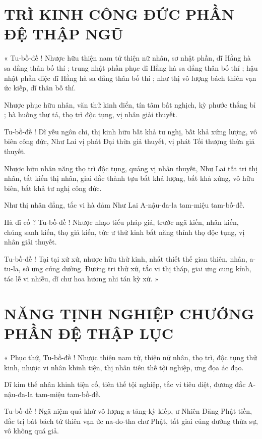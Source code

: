 	\section*{TRÌ KINH CÔNG ĐỨC PHẦN ĐỆ THẬP NGŨ}
	
	« Tu-bồ-đề ! Nhược hữu thiện nam tử thiện nữ nhân, sơ nhật phần, dĩ Hằng hà sa đẳng thân bố thí ; trung nhật phần phục dĩ Hằng hà sa đẳng thân bố thí ; hậu nhật phần diệc dĩ Hằng hà sa đẳng thân bố thí ; như thị vô lượng bách thiên vạn ức kiếp,  dĩ thân bố thí.
	
	Nhược phục hữu nhân, văn thử kinh điển, tín tâm bất nghịch, kỳ phước thắng bỉ ; hà huống thư tả, thọ trì độc tụng, vị nhân giải thuyết.
	
	Tu-bồ-đề ! Dĩ yếu ngôn chi, thị kinh hữu bất khả tư nghị, bất khả xứng lượng, vô biên công đức, Như Lai vị phát Đại thừa giả thuyết, vị phát Tối thượng thừa giả thuyết. 
	
	Nhược hữu nhân năng thọ trì độc tụng, quảng vị nhân thuyết, Như Lai tất tri thị nhân, tất kiến thị nhân, giai đắc thành tựu bất khả lượng, bất khả xứng, vô hữu biên, bất khả tư nghị công đức. 
	
	Như thị nhân đẳng, tắc vi hà đảm Như Lai A-nậu-đa-la tam-miệu tam-bồ-đề. 
	
	Hà dĩ cố ? Tu-bồ-đề ! Nhược nhạo tiểu pháp giả, trước ngã kiến, nhân kiến, chúng sanh kiến, thọ giả kiến, tức ư thử kinh bất năng thính thọ độc tụng, vị nhân giải thuyết.
	
	Tu-bồ-đề ! Tại tại xứ xứ, nhược hữu thử kinh, nhất thiết thế gian thiên, nhân, a-tu-la, sở ưng cúng dường. Đương tri thử xứ, tắc vi thị tháp, giai ưng cung kính, tác lễ vi nhiễu, dĩ chư hoa hương nhi tán kỳ xứ. »
	
	\section*{NĂNG TỊNH NGHIỆP CHƯỚNG PHẦN ĐỆ THẬP LỤC}
	
	« Phục thứ, Tu-bồ-đề ! Nhược thiện nam tử, thiện nữ nhân, thọ trì, độc tụng thử kinh, nhược vi nhân khinh tiện, thị nhân tiên thế tội nghiệp, ưng đọa ác đạo.
	
	Dĩ kim thế nhân khinh tiện cố, tiên thế tội nghiệp, tắc vi tiêu diệt, đương đắc A-nậu-đa-la tam-miệu tam-bồ-đề.
	
	Tu-bồ-đề ! Ngã niệm quá khứ vô lượng a-tăng-kỳ kiếp, ư Nhiên Đăng Phật tiền, đắc trị bát bách tứ thiên vạn ức na-do-tha chư Phật, tất giai cúng dường thừa sự, vô không quá giả. 
	
